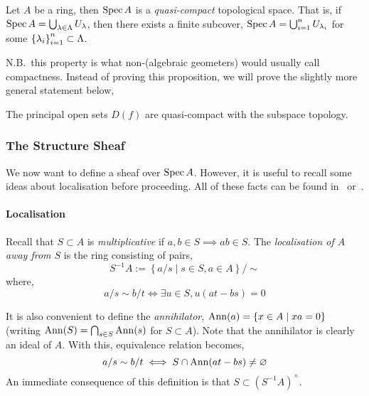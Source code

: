 \documentclass[000-main.tex]{subfiles}
\begin{document}
\begin{proposition}
  Let $A$ be a ring, then $\operatorname{Spec} A$ is a \emph{quasi-compact} topological space.
  That is, if $\operatorname{Spec} A = \bigcup_{\lambda\in \Lambda}U_\lambda$, then there exists a finite subcover, $\operatorname{Spec} A = \bigcup_{i = 1}^n U_{\lambda_i}$ for some ${\qty{\lambda_i}}^n_{i = 1}\subset \Lambda$.
\end{proposition}
N.B.\ this property is what non-(algebraic geometers) would usually call compactness.
Instead of proving this proposition, we will prove the slightly more general statement below,
\begin{proposition}
  The principal open sets $D(f)$ are quasi-compact with the subspace topology.
\end{proposition}

\subsubsection{The Structure Sheaf}%
\label{sec:structure-sheaf}

We now want to define a sheaf over $\operatorname{Spec} A$.
However, it is useful to recall some ideas about localisation before proceeding.
All of these facts can be found in~\cite[][81-86]{altmanTermCommutativeAlgebra2013} or~\cite[][36-49]{atiyahIntroductionCommutativeAlgebra2000}.

\paragraph{Localisation}

Recall that $S\subset A$ is \emph{multiplicative} if $a, b\in S \implies ab\in S$.
The \emph{localisation of $A$ away from $S$} is the ring consisting of pairs,
\begin{displaymath}
  S^{-1}A := \left\{ a/s \mid s\in S, a\in A \right\}/\sim
\end{displaymath}
where,
\begin{displaymath}
  a/s \sim b/t \iff
  \exists u\in S, u(at - bs) = 0
\end{displaymath}

It is also convenient to define the \emph{annihilator}, $\operatorname{Ann}(a) = \left\{ x\in A \mid xa = 0 \right\}$ (writing $\operatorname{Ann}(S) = \bigcap_{s\in S}\operatorname{Ann}(s)$ for $S\subset A$).
Note that the annihilator is clearly an ideal of $A$.
With this, equivalence relation becomes,
\begin{displaymath}
  a/s \sim b/t \iff
  S\cap\operatorname{Ann}(at - bs) \neq \varnothing
\end{displaymath}
An immediate consequence of this definition is that $S\subset {(S^{-1}A)}^{\times}$.
\end{document}
